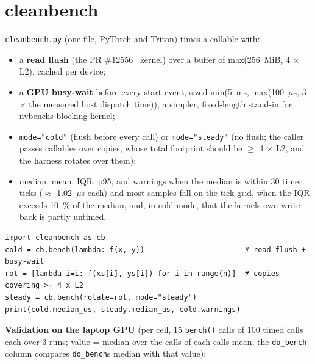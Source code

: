 \documentclass[11pt,a4paper]{article}
\providecommand{\tightlist}{\setlength{\itemsep}{0pt}\setlength{\parskip}{0pt}}
\begin{document}
\section{cleanbench}\label{cleanbench}

\texttt{cleanbench.py} (one file, PyTorch and Triton) times a callable with:

\begin{itemize}
\tightlist
\item
  a \textbf{read flush} (the PR \#12556~\cite{tr12556} kernel) over a buffer of max(256~MiB, 4 \ensuremath{\times} L2), cached per device;
\item
  a \textbf{GPU busy-wait} before every start event, sized min(5~ms, max(100~\ensuremath{\mu}s, 3 \ensuremath{\times} the measured host dispatch time)), a
  simpler, fixed-length stand-in for nvbench\textquotesingle s blocking kernel;
\item
  \texttt{mode="cold"} (flush before every call) or \texttt{mode="steady"} (no flush; the caller passes callables over copies,
  whose total footprint should be \ensuremath{\ge} 4 \ensuremath{\times} L2, and the harness rotates over them);
\item
  median, mean, IQR, p95, and warnings when the median is within 30 timer ticks (\ensuremath{\approx} 1.02~\ensuremath{\mu}s each) and most samples
  fall on the tick grid, when the IQR exceeds 10~\% of the median, and, in cold mode, that the kernel\textquotesingle s own
  write-back is partly untimed.
\end{itemize}

\begin{codebox}
\begin{Verbatim}[fontsize=\small]
import cleanbench as cb
cold = cb.bench(lambda: f(x, y))                       # read flush + busy-wait
rot = [lambda i=i: f(xs[i], ys[i]) for i in range(n)]  # copies covering >= 4 x L2
steady = cb.bench(rotate=rot, mode="steady")
print(cold.median_us, steady.median_us, cold.warnings)
\end{Verbatim}
\end{codebox}

\textbf{Validation on the laptop GPU} (per cell, 15 \texttt{bench()} calls of 100 timed calls each over 3 runs; value = median
over the calls of each call\textquotesingle s mean; the \texttt{do\_\allowbreak{}bench} column compares \texttt{do\_\allowbreak{}bench}\textquotesingle s median with that value):
\end{document}
